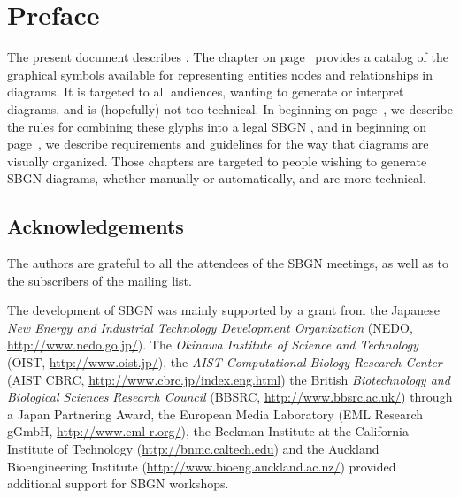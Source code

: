
\chapter{Preface}

The present document describes \SBGNERLone. The chapter  on page ~\pageref{chp:glyph}provides a catalog of the graphical symbols available for representing entities nodes and relationships in \ER diagrams. It is targeted to all audiences, wanting to generate or interpret \ER diagrams, and is (hopefully) not too technical. In  beginning on page~\pageref{chp:grammar}, we describe the rules for combining these glyphs into a legal SBGN \ER, and in  beginning on page~\pageref{chp:layout}, we describe requirements and guidelines for the way that diagrams are visually organized. Those chapters are targeted to people wishing to generate SBGN diagrams, whether manually or automatically, and are more technical.

\section*{Acknowledgements}

The authors are grateful to all the attendees of the SBGN meetings, as well as to the subscribers of the  mailing list.  

% 
The development of SBGN was mainly supported by a grant from the Japanese \emph{New Energy and Industrial Technology Development Organization} (NEDO, \url{http://www.nedo.go.jp/}).  The \emph{Okinawa Institute of Science and Technology} (OIST, \url{http://www.oist.jp/}), the \emph{AIST Computational Biology Research Center} (AIST CBRC, \url{http://www.cbrc.jp/index.eng.html}) the British \emph{Biotechnology and Biological Sciences Research Council} (BBSRC, \url{http://www.bbsrc.ac.uk/}) through a Japan Partnering Award, the European Media Laboratory (EML Research gGmbH, \url{http://www.eml-r.org/}), the Beckman Institute at the California Institute of Technology (\url{http://bnmc.caltech.edu}) and the Auckland Bioengineering Institute (\url{http://www.bioeng.auckland.ac.nz/}) provided additional support for SBGN workshops.

